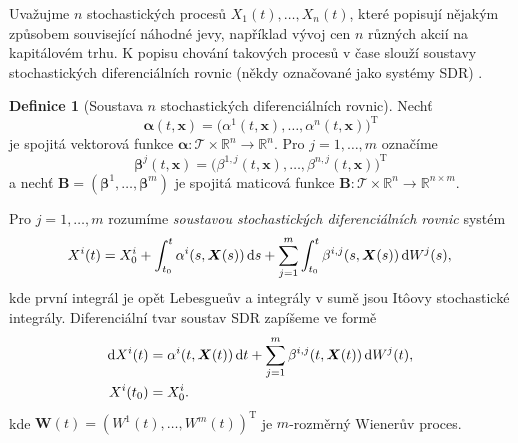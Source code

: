 \documentclass[a4paper,12pt]{report}
\theoremstyle{definition} \newtheorem{definice}[veta]{Definice}
\theoremstyle{remark}
\begin{document}
Uvažujme $n$ stochastických procesů $X_1(t),\dots,X_n(t)$, které popisují nějakým způsobem související náhodné jevy, například vývoj cen $n$ různých akcií na kapitálovém trhu. 
K popisu chování takových procesů v čase slouží soustavy stochastických diferenciálních rovnic (někdy označované jako systémy SDR) .
\begin{definice}[Soustava $n$ stochastických diferenciálních rovnic]
Nechť
$$\boldsymbol\alpha( t,\boldsymbol x)=\big(\alpha^1( t,\boldsymbol{x}),\dots,\alpha^n(t,\boldsymbol{x})\big)^\mathrm{T}$$
je spojitá vektorová funkce $\boldsymbol\alpha:\mathcal{T}\times\mathbb{R}^n\to\mathbb{R}^n$.
Pro $j=1,\dots,m$ označíme 
$$\boldsymbol\beta^{j}(t,\boldsymbol x)=\big(\beta^{1,j}(t,\boldsymbol{x}),\dots,\beta^{n,j}(t,\boldsymbol{x})\big)^\mathrm{T}$$
a nechť $\boldsymbol{B}=(\boldsymbol\beta^{1},\dots,\boldsymbol\beta^{m})$ je spojitá maticová funkce $\boldsymbol{B}:\mathcal{T}\times\mathbb{R}^n\to\mathbb{R}^{n\times m}$.

Pro $j=1,\dots,m$ rozumíme \textit{soustavou stochastických diferenciálních rovnic} systém
\begin{equation}\label{SSDR_reseni}
X^i(t)=X^i_0+\int_{t_0}^t\alpha^i(s,\boldsymbol{X}(s))\,\mathrm{d}s+\sum_{j=1}^m\int_{t_0}^t\beta^{i,j}(s,\boldsymbol{X}(s))\,\mathrm{d}W^j(s),\\%
\end{equation}
kde první integrál je opět Lebesgueův a integrály v sumě jsou It\^oovy stochastické integrály.
Diferenciální tvar soustav SDR zapíšeme ve formě
\begin{align}\label{SSDR_def}
\mathrm{d}X^i(t)&=\alpha^i(t,\boldsymbol{X}(t))\,\mathrm{d}t+\sum_{j=1}^m\beta^{i,j}(t,\boldsymbol{X}(t))\,\mathrm{d}W^j(t),\\%
X^i(t_0)&=X^i_0.\notag
\end{align}
kde $\boldsymbol{W}({t})=(W^1(t),\dots,W^m(t))^\mathrm{T}$ je $m$-rozměrný Wienerův proces.
\end{definice}
\end{document}
